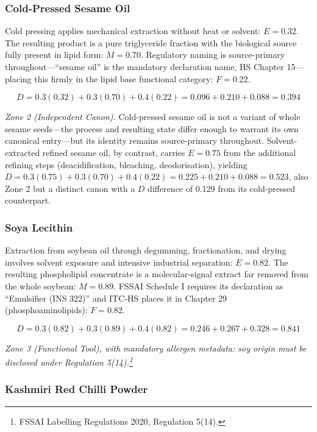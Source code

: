 \documentclass[12pt,a3paper]{article}
\begin{document}
\subsubsection{Cold-Pressed Sesame Oil}

Cold pressing applies mechanical extraction without heat or solvent: $E = 0.32$. The resulting product is a pure triglyceride fraction with the biological source fully present in lipid form: $M = 0.70$. Regulatory naming is source-primary throughout---``sesame oil'' is the mandatory declaration name, HS Chapter 15---placing this firmly in the lipid base functional category: $F = 0.22$.

$$D = 0.3(0.32) + 0.3(0.70) + 0.4(0.22) = 0.096 + 0.210 + 0.088 = \mathbf{0.394}$$

\textit{Zone 2 (Independent Canon).} Cold-pressed sesame oil is not a variant of whole sesame seeds---the process and resulting state differ enough to warrant its own canonical entry---but its identity remains source-primary throughout. Solvent-extracted refined sesame oil, by contrast, carries $E = 0.75$ from the additional refining steps (deacidification, bleaching, deodorisation), yielding $D = 0.3(0.75) + 0.3(0.70) + 0.4(0.22) = 0.225 + 0.210 + 0.088 = 0.523$, also Zone 2 but a distinct canon with a $D$ difference of 0.129 from its cold-pressed counterpart.

\subsubsection{Soya Lecithin}

Extraction from soybean oil through degumming, fractionation, and drying involves solvent exposure and intensive industrial separation: $E = 0.82$. The resulting phospholipid concentrate is a molecular-signal extract far removed from the whole soybean: $M = 0.89$. FSSAI Schedule I requires its declaration as ``Emulsifier (INS 322)'' and ITC-HS places it in Chapter 29 (phosphoaminolipids): $F = 0.82$.

$$D = 0.3(0.82) + 0.3(0.89) + 0.4(0.82) = 0.246 + 0.267 + 0.328 = \mathbf{0.841}$$

\textit{Zone 3 (Functional Tool), with mandatory allergen metadata: soy origin must be disclosed under Regulation 5(14).\footnote{FSSAI Labelling Regulations 2020, Regulation 5(14).}}

\subsubsection{Kashmiri Red Chilli Powder}
\end{document}
